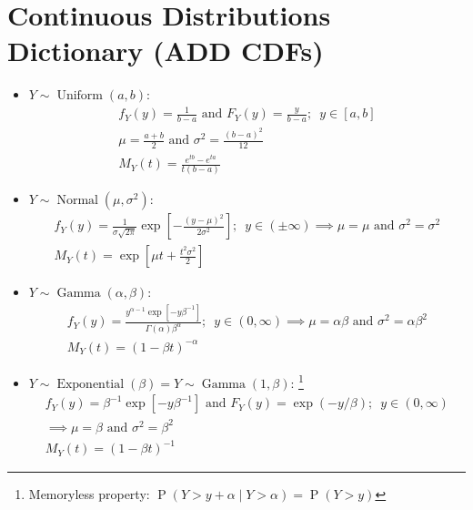 \documentclass[fontsize=12pt]{article}
\newcommand{\defn}[1]{\textbf{#1}:}
\newcommand{\pr}[1]{\operatorname{P}(#1)}
\newcommand{\unidist}[3]{#1 \sim \operatorname{Uniform}(#2, #3)}
\newcommand{\normdist}[3]{#1 \sim \operatorname{Normal}(#2, #3)}
\newcommand{\expdist}[2]{#1 \sim \operatorname{Exponential}(#2)}
\newcommand{\gamdist}[3]{#1 \sim \operatorname{Gamma}(#2, #3)}
\renewcommand{\and}{\text{ and }}
\begin{document}
\section{Continuous Distributions Dictionary (ADD CDFs)}
\begin{itemize}
    \item \defn{$\unidist{Y}{a}{b}$}
    \begin{gather}
        f_Y(y) = \frac{1}{b-a} \and F_Y(y) = \frac{y}{b-a}; \enspace y \in [a,b]\\
        \mu = \frac{a+b}{2} \and \sigma^2 = \frac{(b-a)^2}{12}\\
        M_Y(t) = \frac{e^{tb} - e^{ta}}{t(b-a)}
    \end{gather}

    \item \defn{$\normdist{Y}{\mu}{\sigma^2}$}
    \begin{gather}
        f_Y(y) = \frac{1}{\sigma\sqrt{2\pi}}\exp\left[ -\frac{(y-\mu)^2}{2\sigma^2} \right];
        \enspace y\in(\pm \infty)
        \implies \mu = \mu \and \sigma^2 = \sigma^2\\
        M_Y(t) = \exp\left[ \mu t + \frac{t^2\sigma^2}{2} \right]
    \end{gather}

    \item \defn{$\gamdist{Y}{\alpha}{\beta}$}
    \begin{gather}
        f_Y(y) = \frac{y^{\alpha-1}\exp\left[ -y\beta^{-1} \right]}{\Gamma(\alpha)\beta^\alpha};
        \enspace y\in (0, \infty)
        \implies \mu = \alpha\beta \and \sigma^2 = \alpha\beta^2\\
        M_Y(t) = (1-\beta t)^{-\alpha}
    \end{gather}

    \item \defn{$\expdist{Y}{\beta} = \gamdist{Y}{1}{\beta}$}
    \footnote{Memoryless property: $\pr{Y > y + \alpha \mid Y > \alpha} = \pr{Y > y}$}
    \begin{gather}
        f_Y(y) = \beta^{-1}\exp\left[ -y\beta^{-1} \right] \and F_Y(y) = \exp(-y/\beta);
        \enspace y\in (0, \infty)\\
        \implies \mu = \beta \and \sigma^2 = \beta^2\\
        M_Y(t) = (1-\beta t)^{-1}
    \end{gather}


\end{itemize}
\end{document}

